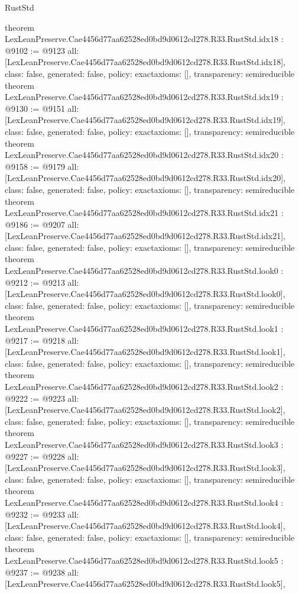 \begin{lexlean}{RustStd}
\begin{coremodule}
{}
theorem LexLeanPreserve.Cae4456d77aa62528ed0bd9d0612cd278.R33.RustStd.idx18 : @9102 := @9123 {
  all: [LexLeanPreserve.Cae4456d77aa62528ed0bd9d0612cd278.R33.RustStd.idx18],
  class: false,
  generated: false,
  policy: exact{axioms: []},
  transparency: semireducible
}
theorem LexLeanPreserve.Cae4456d77aa62528ed0bd9d0612cd278.R33.RustStd.idx19 : @9130 := @9151 {
  all: [LexLeanPreserve.Cae4456d77aa62528ed0bd9d0612cd278.R33.RustStd.idx19],
  class: false,
  generated: false,
  policy: exact{axioms: []},
  transparency: semireducible
}
theorem LexLeanPreserve.Cae4456d77aa62528ed0bd9d0612cd278.R33.RustStd.idx20 : @9158 := @9179 {
  all: [LexLeanPreserve.Cae4456d77aa62528ed0bd9d0612cd278.R33.RustStd.idx20],
  class: false,
  generated: false,
  policy: exact{axioms: []},
  transparency: semireducible
}
theorem LexLeanPreserve.Cae4456d77aa62528ed0bd9d0612cd278.R33.RustStd.idx21 : @9186 := @9207 {
  all: [LexLeanPreserve.Cae4456d77aa62528ed0bd9d0612cd278.R33.RustStd.idx21],
  class: false,
  generated: false,
  policy: exact{axioms: []},
  transparency: semireducible
}
theorem LexLeanPreserve.Cae4456d77aa62528ed0bd9d0612cd278.R33.RustStd.look0 : @9212 := @9213 {
  all: [LexLeanPreserve.Cae4456d77aa62528ed0bd9d0612cd278.R33.RustStd.look0],
  class: false,
  generated: false,
  policy: exact{axioms: []},
  transparency: semireducible
}
theorem LexLeanPreserve.Cae4456d77aa62528ed0bd9d0612cd278.R33.RustStd.look1 : @9217 := @9218 {
  all: [LexLeanPreserve.Cae4456d77aa62528ed0bd9d0612cd278.R33.RustStd.look1],
  class: false,
  generated: false,
  policy: exact{axioms: []},
  transparency: semireducible
}
theorem LexLeanPreserve.Cae4456d77aa62528ed0bd9d0612cd278.R33.RustStd.look2 : @9222 := @9223 {
  all: [LexLeanPreserve.Cae4456d77aa62528ed0bd9d0612cd278.R33.RustStd.look2],
  class: false,
  generated: false,
  policy: exact{axioms: []},
  transparency: semireducible
}
theorem LexLeanPreserve.Cae4456d77aa62528ed0bd9d0612cd278.R33.RustStd.look3 : @9227 := @9228 {
  all: [LexLeanPreserve.Cae4456d77aa62528ed0bd9d0612cd278.R33.RustStd.look3],
  class: false,
  generated: false,
  policy: exact{axioms: []},
  transparency: semireducible
}
theorem LexLeanPreserve.Cae4456d77aa62528ed0bd9d0612cd278.R33.RustStd.look4 : @9232 := @9233 {
  all: [LexLeanPreserve.Cae4456d77aa62528ed0bd9d0612cd278.R33.RustStd.look4],
  class: false,
  generated: false,
  policy: exact{axioms: []},
  transparency: semireducible
}
theorem LexLeanPreserve.Cae4456d77aa62528ed0bd9d0612cd278.R33.RustStd.look5 : @9237 := @9238 {
  all: [LexLeanPreserve.Cae4456d77aa62528ed0bd9d0612cd278.R33.RustStd.look5],
}
\end{coremodule}
\end{lexlean}

